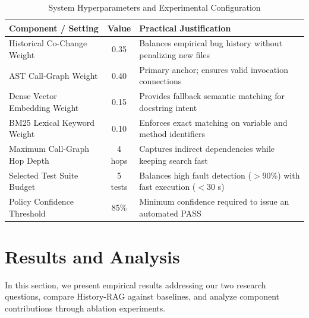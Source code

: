 \documentclass[12pt,onecolumn,draftclsnofoot]{IEEEtran}
\begin{document}
\begin{table}[h]
\centering
\caption{System Hyperparameters and Experimental Configuration}
\label{tab:hyperparams}
\begin{tabular}{@{}lcl@{}}
\toprule
\textbf{Component / Setting} & \textbf{Value} & \textbf{Practical Justification} \\ \midrule
Historical Co-Change Weight & 0.35 & Balances empirical bug history without penalizing new files \\
AST Call-Graph Weight & 0.40 & Primary anchor; ensures valid invocation connections \\
Dense Vector Embedding Weight & 0.15 & Provides fallback semantic matching for docstring intent \\
BM25 Lexical Keyword Weight & 0.10 & Enforces exact matching on variable and method identifiers \\
Maximum Call-Graph Hop Depth & 4 hops & Captures indirect dependencies while keeping search fast \\
Selected Test Suite Budget & 5 tests & Balances high fault detection ($>$90\%) with fast execution ($<$30 s) \\
Policy Confidence Threshold & 85\% & Minimum confidence required to issue an automated PASS \\ \bottomrule
\end{tabular}
\end{table}

\section{Results and Analysis}
\label{sec:results}
In this section, we present empirical results addressing our two research questions, compare History-RAG against baselines, and analyze component contributions through ablation experiments.
\end{document}
